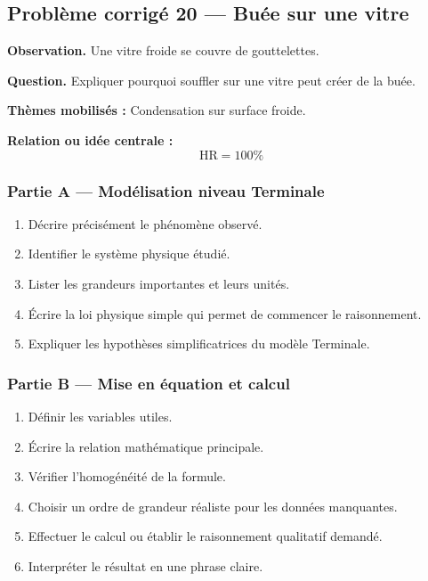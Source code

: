 \documentclass[11pt,a4paper]{article}
\begin{document}
\subsection{Problème corrigé 20 — Buée sur une vitre}

\begin{exercicebox}
\textbf{Observation.} Une vitre froide se couvre de gouttelettes.

\medskip
\textbf{Question.} Expliquer pourquoi souffler sur une vitre peut créer de la buée.

\medskip
\textbf{Thèmes mobilisés :} Condensation sur surface froide.

\medskip
\textbf{Relation ou idée centrale :}
\[
\mathrm{HR}=100\%
\]
\end{exercicebox}

\subsubsection*{Partie A — Modélisation niveau Terminale}

\begin{enumerate}
  \item Décrire précisément le phénomène observé.
  \item Identifier le système physique étudié.
  \item Lister les grandeurs importantes et leurs unités.
  \item Écrire la loi physique simple qui permet de commencer le raisonnement.
  \item Expliquer les hypothèses simplificatrices du modèle Terminale.
\end{enumerate}

\subsubsection*{Partie B — Mise en équation et calcul}

\begin{enumerate}
  \item Définir les variables utiles.
  \item Écrire la relation mathématique principale.
  \item Vérifier l'homogénéité de la formule.
  \item Choisir un ordre de grandeur réaliste pour les données manquantes.
  \item Effectuer le calcul ou établir le raisonnement qualitatif demandé.
  \item Interpréter le résultat en une phrase claire.
\end{enumerate}
\end{document}
